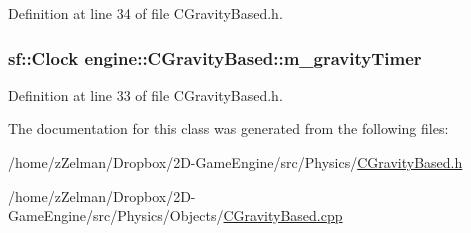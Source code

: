 Definition at line 34 of file C\-Gravity\-Based.\-h.

\hypertarget{classengine_1_1CGravityBased_a124ef300a1b855b6b508bdfede4fca39}{
\subsubsection[{m\-\_\-gravity\-Timer}]{\setlength{\rightskip}{0pt plus 5cm}sf\-::\-Clock engine\-::\-C\-Gravity\-Based\-::m\-\_\-gravity\-Timer\hspace{0.3cm}{\ttfamily [protected]}}}\label{classengine_1_1CGravityBased_a124ef300a1b855b6b508bdfede4fca39}


Definition at line 33 of file C\-Gravity\-Based.\-h.



The documentation for this class was generated from the following files\-:\begin{DoxyCompactItemize}
\item 
/home/z\-Zelman/\-Dropbox/2\-D-\/\-Game\-Engine/src/\-Physics/\hyperlink{CGravityBased_8h}{C\-Gravity\-Based.\-h}\item 
/home/z\-Zelman/\-Dropbox/2\-D-\/\-Game\-Engine/src/\-Physics/\-Objects/\hyperlink{CGravityBased_8cpp}{C\-Gravity\-Based.\-cpp}\end{DoxyCompactItemize}
